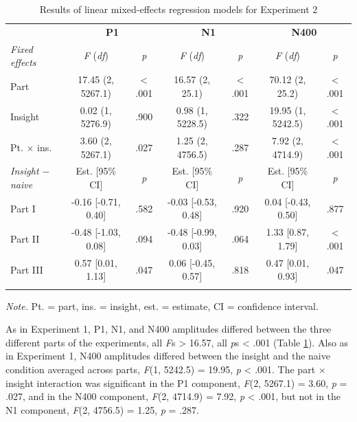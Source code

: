 \documentclass[
  english,
  man,11pt,floatsintext]{apa7}
\begin{document}
\begin{table}[tbp]

\begin{center}
\begin{threeparttable}

\caption{\label{tab:exp2-table}Results of linear mixed-effects regression models for Experiment 2}

\footnotesize{

\begin{tabular}{lcccccc}
\toprule
 & \multicolumn{2}{c}{\textbf{P1}} & \multicolumn{2}{c}{\textbf{N1}} & \multicolumn{2}{c}{\textbf{N400}} \\
\cmidrule(r){2-3} \cmidrule(r){4-5} \cmidrule(r){6-7}
\textit{Fixed effects} & \textit{F} (\textit{df}) & \textit{p} & \textit{F} (\textit{df}) & \textit{p} & \textit{F} (\textit{df}) & \textit{p}\\
\midrule
Part & 17.45 (2, 5267.1) & < .001 & 16.57 (2, 25.1) & < .001 & 70.12 (2, 25.2) & < .001\\
Insight & 0.02 (1, 5276.9) & .900 & 0.98 (1, 5228.5) & .322 & 19.95 (1, 5242.5) & < .001\\
Pt. × ins. & 3.60 (2, 5267.1) & .027 & 1.25 (2, 4756.5) & .287 & 7.92 (2, 4714.9) & < .001\\
\textit{Insight $-$  naive} & Est. [95\% CI] & \textit{p} & Est. [95\% CI] & \textit{p} & Est. [95\% CI] & \textit{p}\\ \midrule
Part I & -0.16 [-0.71, 0.40] & .582 & -0.03 [-0.53, 0.48] & .920 & 0.04 [-0.43, 0.50] & .877\\
Part II & -0.48 [-1.03, 0.08] & .094 & -0.48 [-0.99, 0.03] & .064 & 1.33 [0.87, 1.79] & < .001\\
Part III & 0.57 [0.01, 1.13] & .047 & 0.06 [-0.45, 0.57] & .818 & 0.47 [0.01, 0.93] & .047\\
\bottomrule
\addlinespace
\end{tabular}

}

\begin{tablenotes}[para]
\normalsize{\textit{Note.} Pt. = part, ins. = insight, est. = estimate, CI = confidence interval.}
\end{tablenotes}

\end{threeparttable}
\end{center}

\end{table}

As in Experiment 1, P1, N1, and N400 amplitudes differed between the three different parts of the experiments, all \emph{F}s \textgreater{} 16.57, all \emph{p}s \textless{} .001 (Table \ref{tab:exp2-table}). Also as in Experiment 1, N400 amplitudes differed between the insight and the naive condition averaged across parts, \emph{F}(1, 5242.5) = 19.95, \emph{p} \textless{} .001. The part × insight interaction was significant in the P1 component, \emph{F}(2, 5267.1) = 3.60, \emph{p} = .027, and in the N400 component, \emph{F}(2, 4714.9) = 7.92, \emph{p} \textless{} .001, but not in the N1 component, \emph{F}(2, 4756.5) = 1.25, \emph{p} = .287.
\end{document}
